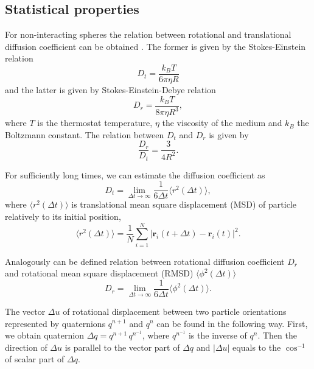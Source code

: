 \subsection{Statistical properties}
For non-interacting spheres the relation between rotational and translational diffusion coefficient can be obtained \cite{C5SM02754C}. The former is given by the Stokes-Einstein relation
\begin{equation}
\label{eq:translational_diffusion_coefficient}
	D_t = \frac{k_B T}{6 \pi \eta R}
\end{equation}
and the latter is given by Stokes-Einstein-Debye relation
\begin{equation}
\label{eq:rotational_diffusion_coefficient}
	D_r = \frac{k_B T}{8 \pi \eta R^3}
	,
\end{equation}
where $T$ is the thermostat temperature, $\eta$ the viscosity of the medium and $k_B$ the Boltzmann constant. The relation between $D_t$ and $D_r$ is given by
\begin{equation}
	\frac{D_r}{D_t} = \frac{3}{4 R^2}
	.
\end{equation}

For sufficiently long times, we can estimate the diffusion coefficient as
\begin{equation}
\label{eq:translation_diffusion_vs_displacement}
	D_t = \lim_{\Delta t \to \infty} \frac{1}{6 \Delta t} \langle r^2(\Delta t)\rangle
	,
\end{equation}
where $\langle r^2(\Delta t)\rangle$ is translational mean square displacement (MSD) of particle relatively to its initial position,
\begin{equation}
	\langle r^2(\Delta t)\rangle
	 = \frac{1}{N} \sum_{i=1}^{N} |\boldsymbol{r}_i(t + \Delta t) - \boldsymbol{r}_i(t)|^2
	 .
\end{equation}

Analogously can be defined relation between rotational diffusion coefficient $D_r$ and rotational mean square displacement (RMSD) $\langle \phi^2(\Delta t) \rangle$
\begin{equation}
\label{eq:rotational_diffusion_vs_displacement}
	D_r = \lim_{\Delta t \to \infty} \frac{1}{6 \Delta t} \langle \phi^2(\Delta t)\rangle
	.
\end{equation}

The vector $\Delta u$ of rotational displacement between two particle orientations represented by quaternions $q^{n+1}$ and $q^n$ can be found in the following way. First, we obtain quaternion $\Delta q = q^{n+1}\, q^{n^{-1}}$, where $q^{n^{-1}}$ is the inverse of $q^n$. Then the direction of $\Delta u$ is parallel to the vector part of $\Delta q$ and $|\Delta u|$ equals to the $\cos^{-1}$ of scalar part of $\Delta q$.

